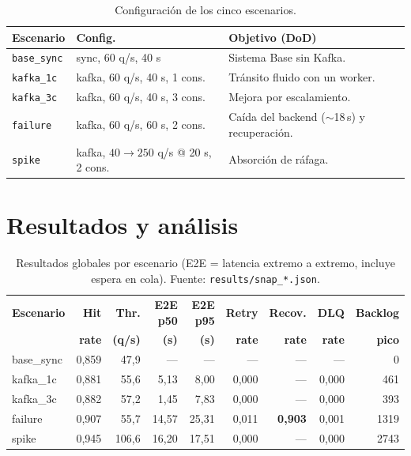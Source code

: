 \documentclass[11pt,a4paper]{article}
\begin{document}
\begin{table}[H]
\centering
\small
\begin{tabular}{@{}llp{6.5cm}@{}}
\toprule
\textbf{Escenario} & \textbf{Config.} & \textbf{Objetivo (DoD)} \\
\midrule
\texttt{base\_sync} & sync, 60 q/s, 40 s & Sistema Base sin Kafka. \\
\texttt{kafka\_1c}  & kafka, 60 q/s, 40 s, 1 cons. & Tránsito fluido con un worker. \\
\texttt{kafka\_3c}  & kafka, 60 q/s, 40 s, 3 cons. & Mejora por escalamiento. \\
\texttt{failure}    & kafka, 60 q/s, 60 s, 2 cons. & Caída del backend ($\sim$18\,s) y recuperación. \\
\texttt{spike}      & kafka, $40\to250$ q/s @ 20 s, 2 cons. & Absorción de ráfaga. \\
\bottomrule
\end{tabular}
\caption{Configuración de los cinco escenarios.}
\label{tab:config}
\end{table}

\section{Resultados y análisis}

\begin{table}[H]
\centering
\small
\setlength{\tabcolsep}{4pt}
\begin{tabular}{@{}lrrrrrrrr@{}}
\toprule
\textbf{Escenario} & \textbf{Hit} & \textbf{Thr.} & \textbf{E2E p50} & \textbf{E2E p95} & \textbf{Retry} & \textbf{Recov.} & \textbf{DLQ} & \textbf{Backlog} \\
 & \textbf{rate} & \textbf{(q/s)} & \textbf{(s)} & \textbf{(s)} & \textbf{rate} & \textbf{rate} & \textbf{rate} & \textbf{pico} \\
\midrule
base\_sync & 0,859 & 47,9 & --- & --- & --- & --- & --- & 0 \\
kafka\_1c  & 0,881 & 55,6 & 5,13 & 8,00 & 0,000 & --- & 0,000 & 461 \\
kafka\_3c  & 0,882 & 57,2 & 1,45 & 7,83 & 0,000 & --- & 0,000 & 393 \\
failure    & 0,907 & 55,7 & 14,57 & 25,31 & 0,011 & \textbf{0,903} & 0,001 & 1319 \\
spike      & 0,945 & 106,6 & 16,20 & 17,51 & 0,000 & --- & 0,000 & 2743 \\
\bottomrule
\end{tabular}
\caption{Resultados globales por escenario (E2E = latencia extremo a extremo, incluye espera en cola). Fuente: \texttt{results/snap\_*.json}.}
\label{tab:resultados}
\end{table}
\end{document}
